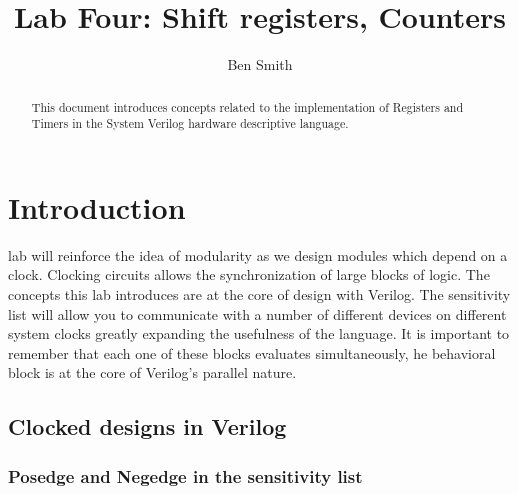 
\title{Lab Four: Shift registers, Counters}
\author{Ben Smith}




  \maketitle
    \begin{abstract}
      This document introduces concepts related to the implementation of Registers and Timers in the System Verilog hardware descriptive language.
    \end{abstract}
\section{Introduction}
   lab will reinforce the idea of modularity as we design modules which depend on a clock. Clocking circuits allows the synchronization of large blocks of logic. The concepts this lab introduces are at the core of design with Verilog. The sensitivity list will allow you to communicate with a number of different devices on different system clocks greatly expanding the usefulness of the language. It is important to remember that each one of these blocks evaluates simultaneously, he behavioral block is at the core of Verilog's parallel nature.

  \subsection{Clocked designs in Verilog}
    \subsubsection{Posedge and Negedge in the sensitivity list}


